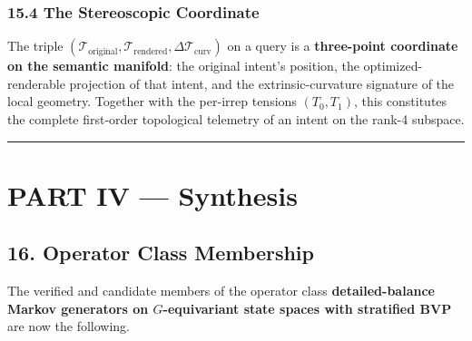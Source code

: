 \documentclass[
  11pt,
]{article}
\begin{document}
\subsubsection{15.4 The Stereoscopic
Coordinate}\label{the-stereoscopic-coordinate}

The triple
\((\mathcal{T}_\text{original}, \mathcal{T}_\text{rendered}, \Delta\mathcal{T}_\text{curv})\)
on a query is a \textbf{three-point coordinate on the semantic
manifold}: the original intent's position, the optimized-renderable
projection of that intent, and the extrinsic-curvature signature of the
local geometry. Together with the per-irrep tensions \((T_0, T_1)\),
this constitutes the complete first-order topological telemetry of an
intent on the rank-4 subspace.

\begin{center}\rule{0.5\linewidth}{0.5pt}\end{center}

\section{PART IV --- Synthesis}\label{part-iv-synthesis}

\subsection{16. Operator Class
Membership}\label{operator-class-membership}

The verified and candidate members of the operator class
\textbf{detailed-balance Markov generators on \(G\)-equivariant state
spaces with stratified BVP} are now the following.
\end{document}
